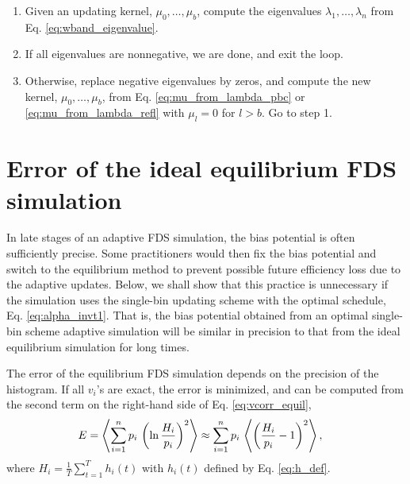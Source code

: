 \documentclass[reprint, floatfix]{revtex4-1}
\begin{document}
%
\begin{enumerate}
  \item
    Given an updating kernel, $\mu_0, \dots, \mu_b$,
    compute the eigenvalues
    $\lambda_1, \dots, \lambda_n$
    from Eq. \eqref{eq:wband_eigenvalue}.
  \item
    If all eigenvalues are nonnegative,
    we are done, and exit the loop.
  \item
    Otherwise, replace negative eigenvalues by zeros,
    and compute the new kernel,
    $\mu_0, \dots, \mu_b$, from
    Eq. \eqref{eq:mu_from_lambda_pbc}
    or
    \eqref{eq:mu_from_lambda_refl}
    with $\mu_l = 0$ for $l > b$.
    Go to step 1.
\end{enumerate}



\section{\label{sec:equilerr}
Error of the ideal equilibrium FDS simulation}




In late stages of an adaptive FDS simulation,
the bias potential is often sufficiently precise.
Some practitioners would then fix
the bias potential and switch
to the equilibrium method
to prevent possible future efficiency loss
due to the adaptive updates.
%
Below, we shall show that this practice is unnecessary
if the simulation uses the single-bin updating scheme
with the optimal schedule, Eq. \eqref{eq:alpha_invt1}.
%
That is, the bias potential obtained from
an optimal single-bin scheme adaptive simulation
will be similar in precision to that from
the ideal equilibrium simulation
for long times.
%

The error of the equilibrium FDS simulation
depends on the precision of the histogram.
%
If all $v_i$'s are exact,
the error is minimized, and can be computed
from the second term
on the right-hand side of Eq. \eqref{eq:vcorr_equil},
%
\begin{align}
  E
  &=
  \left\langle
    \sum_{ i = 1 }^ n
      p_i \,
      \left(
        \ln \frac { H_i }
                  { p_i }
      \right)^2
  \right\rangle
  \approx
  \sum_{ i = 1 }^ n
    p_i \,
    \left\langle
      \left(
        \frac { H_i }
              { p_i }
        - 1
      \right)^2
    \right\rangle,
\notag
\end{align}
where
$H_i = \frac{1}{T} \sum_{t = 1}^T h_i(t)$
with
$h_i(t)$ defined by Eq. \eqref{eq:h_def}.
\end{document}
